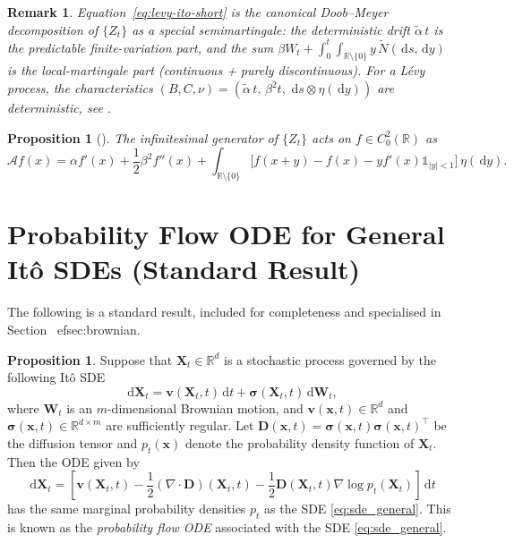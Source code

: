 \documentclass{article}
\newtheorem{rem}[thm]{Remark}
\newtheorem{prop}[thm]{Proposition}
\newcommand{\levy}{{L\'evy }}
\def\1{\mathds{1}}
\def\R{\mathbb{R}}
\def\d{\,\mathrm{d}}
\def\half{\frac{1}{2}}
\theoremstyle{definition}
\newtheorem{proposition}{Proposition}[section]
\begin{document}
\begin{rem}
Equation~\eqref{eq:levy-ito-short} is the canonical Doob--Meyer decomposition of $\{Z_t\}$ as a special semimartingale: the deterministic drift $\widetilde{\alpha}\,t$ is the predictable finite-variation part, and the sum $\beta W_t + \int_0^t\!\int_{\R\setminus\{0\}} y\,\widetilde{N}(\d s, \d y)$ is the local-martingale part (continuous + purely discontinuous). For a \levy process, the characteristics $(B, C, \nu) = (\widetilde{\alpha}\,t,\, \beta^2 t,\, \d s \otimes \eta(\d y))$ are deterministic, see \cite[Corollary~II.4.19]{JacodShiryaev2003}.
\end{rem}

\begin{prop}[{\cite[Proposition~3.16]{ContTankov2004}}]
\label{prop:generator}
The infinitesimal generator of $\{Z_t\}$ acts on $f \in C^2_0(\R)$ as
\begin{equation}\label{eq:generator}
  \mathcal{A}f(x) = \alpha f'(x) + \half\beta^2 f''(x)
    + \int_{\R\setminus\{0\}}\bigl[f(x+y) - f(x) - yf'(x)\1_{|y|<1}\bigr]\,\eta(\d y).
\end{equation}
\end{prop}

\section{Probability Flow ODE for General It\^{o} SDEs (Standard Result)}\label{app:general_prob_flow}
The following is a standard result, included for completeness and specialised in Section~
ef{sec:brownian}.
\begin{proposition} \label{prop:general_prob_flow}
    Suppose that $\boldsymbol{X}_t \in \mathbb{R}^d$ is a stochastic process governed by the following It\^{o} SDE
    \begin{equation}
        \mathrm{d}\boldsymbol{X}_t = \mathbf{v}(\boldsymbol{X}_t, t) \, \mathrm{d}t + \boldsymbol{\sigma}(\boldsymbol{X}_t, t) \, \mathrm{d}\mathbf{W}_t,
        \label{eq:sde_general}
    \end{equation}
    where $\mathbf{W}_t$ is an $m$-dimensional Brownian motion, and $\mathbf{v}(\boldsymbol{x}, t) \in \mathbb{R}^d$ and $\boldsymbol{\sigma}(\boldsymbol{x}, t) \in \mathbb{R}^{d \times m}$ are sufficiently regular. Let $\mathbf{D}(\boldsymbol{x}, t) = \boldsymbol{\sigma}(\boldsymbol{x}, t) \boldsymbol{\sigma}(\boldsymbol{x}, t)^\top$ be the diffusion tensor and $p_t(\boldsymbol{x})$ denote the probability density function of $\boldsymbol{X}_t$. Then the ODE given by
    \begin{equation}
        \mathrm{d}\boldsymbol{X}_t = \left[ \mathbf{v}(\boldsymbol{X}_t, t) - \frac{1}{2}(\nabla \cdot \mathbf{D})(\boldsymbol{X}_t, t) - \frac{1}{2} \mathbf{D}(\boldsymbol{X}_t, t) \nabla \log p_t(\boldsymbol{X}_t) \right] \, \mathrm{d}t
        \label{eq:general_prob_flow_ode}
    \end{equation}
    has the same marginal probability densities $p_t$ as the SDE \eqref{eq:sde_general}. This is known as the \textit{probability flow ODE} associated with the SDE \eqref{eq:sde_general}.
\end{proposition}
\end{document}

